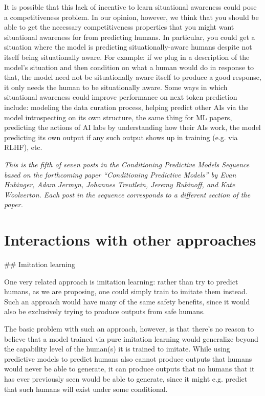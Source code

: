 {     It is possible that this lack of incentive to learn situational awareness could pose a competitiveness problem. In our opinion, however, we think that you should be able to get the necessary competitiveness properties that you might want situational awareness for from predicting humans. In particular, you could get a situation where the model is predicting situationally-aware humans despite not itself being situationally aware. For example: if we plug in a description of the model's situation and then condition on what a human would do in response to that, the model need not be situationally aware itself to produce a good response, it only needs the human to be situationally aware.
     Some ways in which situational awareness could improve performance on next token prediction include: modeling the data curation process, helping predict other AIs via the model introspecting on its own structure, the same thing for ML papers, predicting the actions of AI labs by understanding how their AIs work, the model predicting its own output if any such output shows up in training (e.g. via RLHF), etc.


\textit{This is the fifth of seven posts in the Conditioning Predictive Models Sequence based on the forthcoming paper ``Conditioning Predictive Models'' by Evan Hubinger, Adam Jermyn, Johannes Treutlein, Jeremy Rubinoff, and Kate Woolverton. Each post in the sequence corresponds to a different section of the paper.}

\section{Interactions with other approaches}
\label{sec:5}


## Imitation learning

One very related approach is imitation learning: rather than try to predict humans, as we are proposing, one could simply train to imitate them instead. Such an approach would have many of the same safety benefits, since it would also be exclusively trying to produce outputs from safe humans.

The basic problem with such an approach, however, is that there's no reason to believe that a model trained via pure imitation learning would generalize beyond the capability level of the human(s) it is trained to imitate. While using predictive models to predict humans also cannot produce outputs that humans would never be able to generate, it can produce outputs that no humans that it has ever previously seen would be able to generate, since it might e.g. predict that such humans will exist under some conditional.

}
